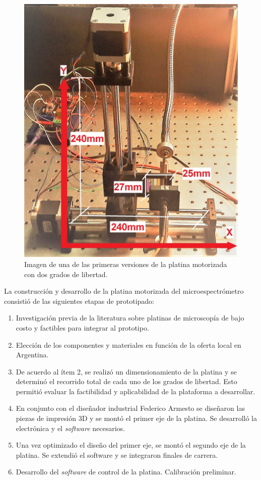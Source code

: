 \begin{figure}[H]
	\centering
	\includegraphics[scale=0.16]{Figs/microespectrometro/stageearly.jpg}
	\caption{Imagen de una de las primeras versiones de la platina motorizada con dos grados de libertad.}
	\label{fig:plato0}
\end{figure}


La construcción y desarrollo de la platina motorizada del microespectrómetro consistió de las siguientes etapas de prototipado:

\begin{enumerate}
\item Investigación previa de la literatura sobre platinas de microscopía de bajo costo y factibles para integrar al prototipo.
\item Elección de los componentes y materiales en función de la oferta local en Argentina.
\item De acuerdo al ítem 2, se realizó un dimensionamiento de la platina y se determinó el recorrido total de cada uno de los grados de libertad. Esto permitió evaluar la factibilidad y aplicabilidad de la plataforma a desarrollar.
\item En conjunto con el diseñador industrial Federico Armesto se diseñaron las piezas de impresión 3D y se montó el primer eje de la platina. Se desarrolló la electrónica y el \textit{software} necesarios.
\item Una vez optimizado el diseño del primer eje, se montó el segundo eje de la platina. Se extendió el software y se integraron finales de carrera.
\item Desarrollo del \textit{software} de control de la platina. Calibración preliminar.
\end{enumerate}

